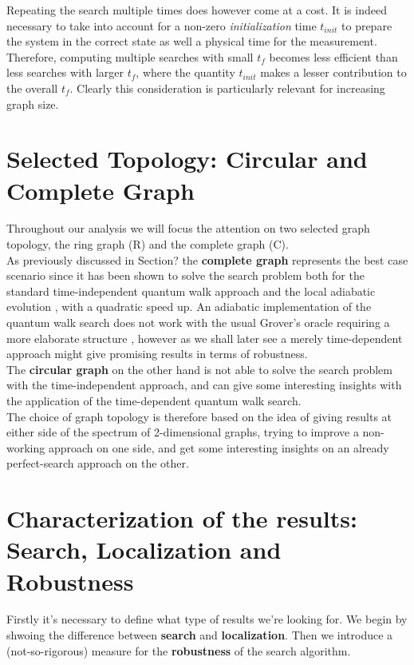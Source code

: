         Repeating the search multiple times does however come at a cost. It is indeed necessary to take into account for a non-zero \textit{initialization} time $t_{init}$ to prepare the system in the correct state as well a physical time for the measurement. Therefore, computing multiple searches with small $t_f$ becomes less efficient than less searches with larger $t_f$, where the quantity $t_{init}$ makes a lesser contribution to the overall $t_f$. Clearly this consideration is particularly relevant for increasing graph size.

\section{Selected Topology: Circular and Complete Graph}
    Throughout our analysis we will focus the attention on two selected graph topology, the ring graph (R) and the complete graph (C). \\

    As previously discussed in Section? the \textbf{complete graph} represents the best case scenario since it has been shown to solve the search problem both for the standard time-independent quantum walk approach \cite{Childs2004} and the local adiabatic evolution \cite{Roland2002}, with a quadratic speed up. An adiabatic implementation of the quantum walk search does not work with the usual Grover's oracle requiring a more elaborate structure \cite{Wong2016}, however as we shall later see a merely time-dependent approach might give promising results in terms of robustness.  \\

    The \textbf{circular graph} on the other hand is not able to solve the search problem with the time-independent approach, and can give some interesting insights with the application of the time-dependent quantum walk search.  \\

    The choice of graph topology is therefore based on the idea of giving results at either side of the spectrum of 2-dimensional graphs, trying to improve a non-working approach on one side, and get some interesting insights on an already perfect-search approach on the other.

\section{Characterization of the results: Search, Localization and Robustness}
    Firstly it's necessary to define what type of results we're looking for. We begin by shwoing the difference between \textbf{search} and \textbf{localization}. Then we introduce a (not-so-rigorous) measure for the \textbf{robustness} of the search algorithm.

